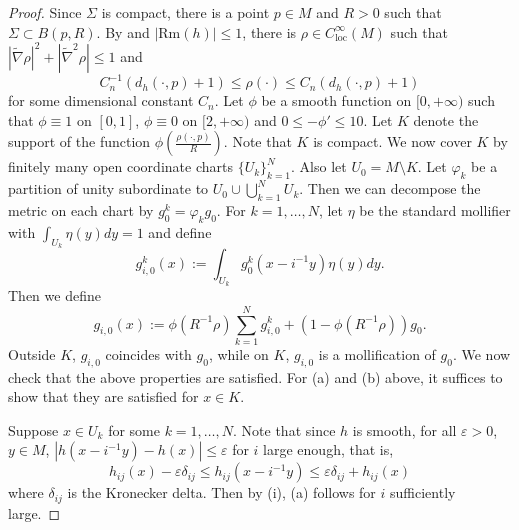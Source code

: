 \documentclass[12pt]{amsart}
\theoremstyle{plain}
\theoremstyle{plain}
\theoremstyle{definition}
\theoremstyle{remark}
\numberwithin{equation}{subsection}
\newcommand{\hdel}{\tilde{\nabla}}
\begin{document}
\begin{proof}
    Since $\Sigma$ is compact, there is a point $p \in M$ and $R > 0$ such that $\Sigma \subset B(p,R)$. By \cite{tam_exhaustion_2010} and $|\text{Rm}(h)|\leq 1$, there is $\rho \in C^\infty_\text{loc}(M)$ such that $|\hdel \rho|^2 + |\hdel^2 \rho| \leq 1$ and
    \begin{equation*}
        C_n^{-1}(d_h(\cdot, p)+1)\leq \rho(\cdot) \leq C_n(d_h(\cdot,p) + 1)
    \end{equation*}
    for some dimensional constant $C_n$. Let $\phi$ be a smooth function on $[0,+\infty)$ such that $\phi \equiv 1$ on $[0,1]$, $\phi \equiv 0$ on $[2,+\infty)$ and $0\leq-\phi'\leq 10$. Let $K$ denote the support of the function $\phi(\frac{\rho(\cdot, p)}{R})$. Note that $K$ is compact. We now cover $K$ by finitely many open coordinate charts $\{U_k\}_{k=1}^N$. Also let $U_0 = M \setminus K$. Let $\varphi_k$ be a partition of unity subordinate to $U_0 \cup \bigcup\limits_{k=1}^N U_k$. Then we can decompose the metric on each chart by $g_0^k = \varphi_k g_0$. For $k = 1,\dots,N$, let $\eta$ be the standard mollifier with $\int_{U_k} \eta(y)dy = 1$ and define
    \begin{equation*}
        g_{i,0}^k(x) := \int_{U_k} g_0^k(x-i^{-1}y)\eta(y)dy.
    \end{equation*}
    Then we define
    \begin{equation*}
        g_{i,0}(x) := \phi(R^{-1}\rho)\sum\limits_{k=1}^N g_{i,0}^k + (1-\phi(R^{-1}\rho))g_0.
    \end{equation*}
    Outside $K$, $g_{i,0}$ coincides with $g_0$, while on $K$, $g_{i,0}$ is a mollification of $g_0$. We now check that the above properties are satisfied. For (a) and (b) above, it suffices to show that they are satisfied for $x \in K$.
    
    Suppose $x \in U_k$ for some $k = 1,\dots,N$. Note that since $h$ is smooth, for all $\varepsilon > 0$, $y\in M$, $|h(x-i^{-1}y) - h(x)| \leq \varepsilon$ for $i$ large enough, that is,
    \begin{equation*}
        h_{ij}(x) - \varepsilon\delta_{ij} \leq h_{ij}(x-i^{-1}y) \leq \varepsilon\delta_{ij} + h_{ij}(x)
    \end{equation*}
    where $\delta_{ij}$ is the Kronecker delta. Then by (i), (a) follows for $i$ sufficiently large.
    

\end{proof}
\end{document}
